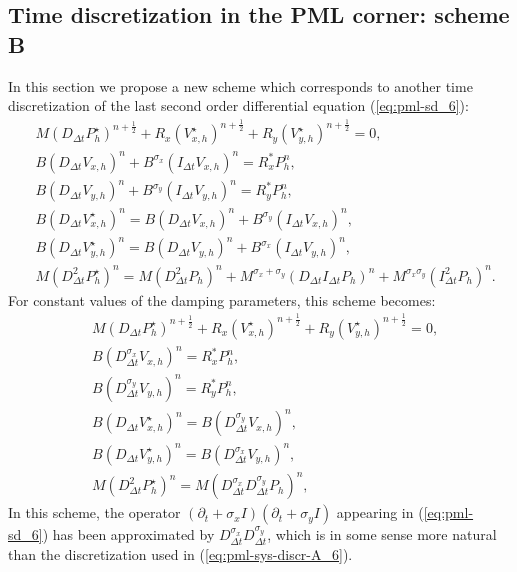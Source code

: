 \documentclass[a4paper]{article}
\def\Vs{V^{\star}}
\def\Ps{P^{\star}}
\begin{document}
\subsection{Time discretization in the PML corner: { scheme B}}
In this section we propose a new scheme which corresponds to another
time discretization of the last second order differential equation
(\ref{eq:pml-sd_6}):
\begin{align*}
&M(D_{\Delta t}\Ps_{h})^{n+\frac12}+R_{x}(\Vs_{x,h})^{n+\frac12}+R_{y}(\Vs_{y,h})^{n+\frac12}=0,\\
&B(D_{\Delta t} V_{x,h})^{n} +  B^{\sigma_x} (I_{\Delta t} V_{x,h})^{n}=R_{x}^{*}P_{h}^{n},\\
&B(D_{\Delta t} V_{y,h})^{n}+ B^{\sigma_y} (I_{\Delta t}V_{y,h})^{n} =R_{y}^{*}P_{h}^{n},\\
&B(D_{\Delta t}\Vs_{x,h})^{n}=B(D_{\Delta t} V_{x,h})^n + B^{\sigma_y}
(I_{\Delta t}V_{x,h})^n ,\\
&B(D_{\Delta t}\Vs_{y,h})^{n}=B(D_{\Delta t} V_{y,h})^n + B^{\sigma_x}
(I_{\Delta t} V_{y,h})^n ,\\
&M(D_{\Delta t}^{2}\Ps_{h})^{n}=M(D_{\Delta t}^2
P_{h})^{n}+ M^{\sigma_x+\sigma_y}   (D_{\Delta t} I_{\Delta t}
{P_{h}})^{n}+    M^{\sigma_x \sigma_y}  (I_{\Delta t}^2 P_{h})^{n}.
\end{align*}
For constant values of the damping parameters, this scheme becomes:
\begin{align}
&M(D_{\Delta t}\Ps_{h})^{n+\frac12}+R_{x}(\Vs_{x,h})^{n+\frac12}+R_{y}(\Vs_{y,h})^{n+\frac12}=0,
\label{eq:pml-sys-discr-B_1}\\
&B(D_{\Delta t}^{\sigma_{x}} V_{x,h})^{n}=R_{x}^{*}P_{h}^{n},\label{eq:pml-sys-discr-B_2}\\
&B(D_{\Delta t}^{\sigma_{y}} V_{y,h})^{n}=R_{y}^{*}P_{h}^{n},\label{eq:pml-sys-discr-B_3}\\
&B(D_{\Delta t}\Vs_{x,h})^{n}=B(D_{\Delta t}^{\sigma_{y}} V_{x,h})^n,\label{eq:pml-sys-discr-B_4}\\
&B(D_{\Delta t}\Vs_{y,h})^{n}=B(D_{\Delta t}^{\sigma_{x}} V_{y,h})^n,\label{eq:pml-sys-discr-B_5}\\
&M(D_{\Delta t}^{2}\Ps_{h})^{n}=M(D_{\Delta t}^{\sigma_{x}} D_{\Delta t}^{\sigma_{y}} P_{h})^{n},
\label{eq:pml-sys-discr-B_6}
\end{align}
In this scheme, the operator $(\partial_{t}+\sigma_x I)(\partial_{t}+\sigma_y I)$ 
appearing in (\ref{eq:pml-sd_6}) has been approximated by 
$D_{\Delta t}^{\sigma_{x}} D_{\Delta t}^{\sigma_{y}}$, which is in
 some sense more natural than the discretization used in (\ref{eq:pml-sys-discr-A_6}). 
\end{document}
